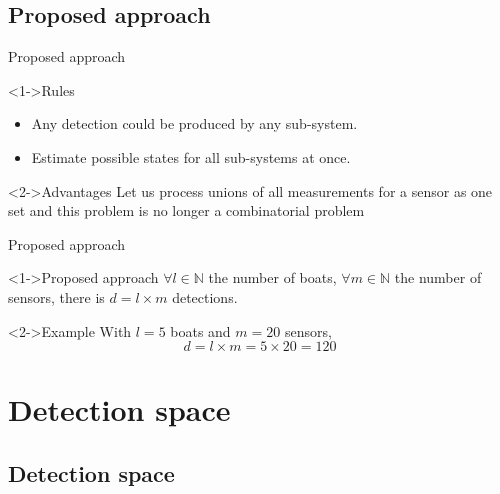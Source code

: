 \documentclass{beamer}
\begin{document}
        \subsection{Proposed approach}
            \begin{frame}{Proposed approach}
                \begin{block}<1->{Rules}
                    \begin{itemize}
                        \item Any detection could be produced by any sub-system.
                        \item Estimate possible states for all sub-systems at once.
                    \end{itemize}
                \end{block}
                \begin{block}<2->{Advantages}
                    Let us process unions of all measurements for a sensor as one set and this problem is no longer a combinatorial problem
                \end{block}
            \end{frame}

            \begin{frame}{Proposed approach}
                \begin{block}<1->{Proposed approach}
                    $\forall l \in \mathbb{N}$ the number of boats, $\forall m \in \mathbb{N}$ the number of sensors, there is $d = l \times m$ detections.
                \end{block}
                \begin{exampleblock}<2->{Example}
                    With $l = 5$ boats and $m = 20$ sensors,
                    $$d = l \times m = 5 \times 20 = 120$$
                \end{exampleblock}
            \end{frame}

    \section{Detection space}

        \subsection{Detection space}
\end{document}
